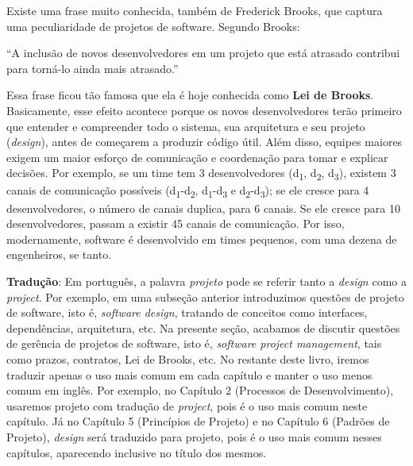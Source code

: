 \documentclass[
  11pt,
  twoside]{book}
\renewenvironment{quote}{\centering \vspace{1.5ex} \begin{tcolorbox}[colback=backcolor, width=4.9in]}{\end{tcolorbox}}
\begin{document}
 Existe uma frase muito conhecida, também de
Frederick Brooks, que captura uma peculiaridade de projetos de software.
Segundo Brooks:

\begin{quote}
``A inclusão de novos desenvolvedores em um projeto que está atrasado
contribui para torná-lo ainda mais atrasado.''
\end{quote}

  Essa
frase ficou tão famosa que ela é hoje conhecida como \textbf{Lei de
Brooks}. Basicamente, esse efeito acontece porque os novos
desenvolvedores terão primeiro que entender e compreender todo o
sistema, sua arquitetura e seu projeto (\emph{design}), antes de
começarem a produzir código útil. Além disso, equipes maiores exigem um
maior esforço de comunicação e coordenação para tomar e explicar
decisões. Por exemplo, se um time tem 3 desenvolvedores
(d\textsubscript{1}, d\textsubscript{2}, d\textsubscript{3}), existem 3
canais de comunicação possíveis (d\textsubscript{1}-d\textsubscript{2},
d\textsubscript{1}-d\textsubscript{3} e
d\textsubscript{2}-d\textsubscript{3}); se ele cresce para 4
desenvolvedores, o número de canais duplica, para 6 canais. Se ele
cresce para 10 desenvolvedores, passam a existir 45 canais de
comunicação. Por isso, modernamente, software é desenvolvido em times
pequenos, com uma dezena de engenheiros, se tanto.

\textbf{Tradução}: Em português, a palavra \emph{projeto} pode se
referir tanto a \emph{design} como a \emph{project}. Por exemplo, em uma
subseção anterior introduzimos questões de projeto de software, isto é,
\emph{software design}, tratando de conceitos como interfaces,
dependências, arquitetura, etc. Na presente seção, acabamos de discutir
questões de gerência de projetos de software, isto é, \emph{software
project management}, tais como prazos, contratos, Lei de Brooks, etc. No
restante deste livro, iremos traduzir apenas o uso mais comum em cada
capítulo e manter o uso menos comum em inglês. Por exemplo, no Capítulo
2 (Processos de Desenvolvimento), usaremos projeto com tradução de
\emph{project}, pois é o uso mais comum neste capítulo. Já no Capítulo 5
(Princípios de Projeto) e no Capítulo 6 (Padrões de Projeto),
\emph{design} será traduzido para projeto, pois é o uso mais comum
nesses capítulos, aparecendo inclusive no título dos mesmos.
\end{document}
